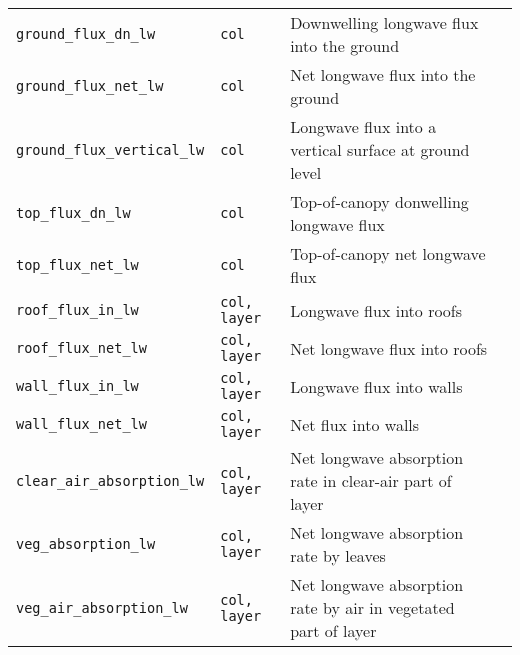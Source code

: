 \documentclass[a4,oneside]{article}
\def\codetabsize{\footnotesize}
\def\codetab#1{{\codetabsize\texttt{#1}}}
\begin{document}
\begin{center}
\begin{longtable}{llLp{7cm}}
\codetab{ground\_flux\_dn\_lw} & \codetab{col} & Downwelling longwave flux into the ground\\
\codetab{ground\_flux\_net\_lw} & \codetab{col} & Net longwave flux into the ground\\
\codetab{ground\_flux\_vertical\_lw} & \codetab{col} & Longwave flux into a vertical surface at ground level\\
\codetab{top\_flux\_dn\_lw} & \codetab{col} & Top-of-canopy donwelling longwave flux\\
\codetab{top\_flux\_net\_lw} & \codetab{col} & Top-of-canopy net longwave flux\\
\codetab{roof\_flux\_in\_lw} & \codetab{col, layer} & Longwave flux into roofs\\
\codetab{roof\_flux\_net\_lw} & \codetab{col, layer} & Net longwave flux into roofs\\
\codetab{wall\_flux\_in\_lw} & \codetab{col, layer} & Longwave flux into walls\\
\codetab{wall\_flux\_net\_lw} & \codetab{col, layer} & Net flux into walls\\
\codetab{clear\_air\_absorption\_lw} & \codetab{col, layer} & Net longwave absorption rate in clear-air part of layer\\
\codetab{veg\_absorption\_lw} & \codetab{col, layer} & Net longwave absorption rate by leaves\\
\codetab{veg\_air\_absorption\_lw} & \codetab{col, layer} & Net longwave absorption rate by air in vegetated part of layer\\
\hline
\end{longtable}
\end{center}
\end{document}
